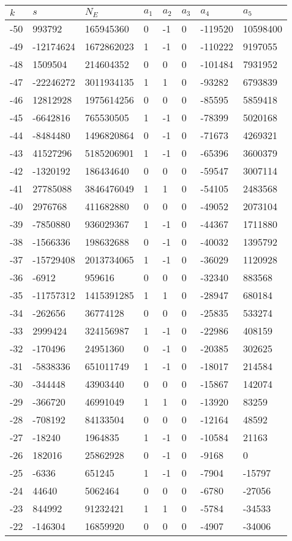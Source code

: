 \documentclass{amsart}
\begin{document}
\begin{longtable}{|l|l|l|lllll|}
\hline
$k$ & $s$ & $N_E$ & $a_1$ & $a_2$ & $a_3$ & $a_4$ & $a_5$\\
\hline
-50&993792&165945360&0&-1&0&-119520&10598400\\
-49&-12174624&1672862023&1&-1&0&-110222&9197055\\
-48&1509504&214604352&0&0&0&-101484&7931952\\
-47&-22246272&3011934135&1&1&0&-93282&6793839\\
-46&12812928&1975614256&0&0&0&-85595&5859418\\
-45&-6642816&765530505&1&-1&0&-78399&5020168\\
-44&-8484480&1496820864&0&-1&0&-71673&4269321\\
-43&41527296&5185206901&1&-1&0&-65396&3600379\\
-42&-1320192&186434640&0&0&0&-59547&3007114\\
-41&27785088&3846476049&1&1&0&-54105&2483568\\
-40&2976768&411682880&0&0&0&-49052&2073104\\
-39&-7850880&936029367&1&-1&0&-44367&1711880\\
-38&-1566336&198632688&0&-1&0&-40032&1395792\\
-37&-15729408&2013734065&1&-1&0&-36029&1120928\\
-36&-6912&959616&0&0&0&-32340&883568\\
-35&-11757312&1415391285&1&1&0&-28947&680184\\
-34&-262656&36774128&0&0&0&-25835&533274\\
-33&2999424&324156987&1&-1&0&-22986&408159\\
-32&-170496&24951360&0&-1&0&-20385&302625\\
-31&-5838336&651011749&1&-1&0&-18017&214584\\
-30&-344448&43903440&0&0&0&-15867&142074\\
-29&-366720&46991049&1&1&0&-13920&83259\\
-28&-708192&84133504&0&0&0&-12164&48592\\
-27&-18240&1964835&1&-1&0&-10584&21163\\
-26&182016&25862928&0&-1&0&-9168&0\\
-25&-6336&651245&1&-1&0&-7904&-15797\\
-24&44640&5062464&0&0&0&-6780&-27056\\
-23&844992&91232421&1&1&0&-5784&-34533\\
-22&-146304&16859920&0&0&0&-4907&-34006\\

\end{longtable}
\end{document}
